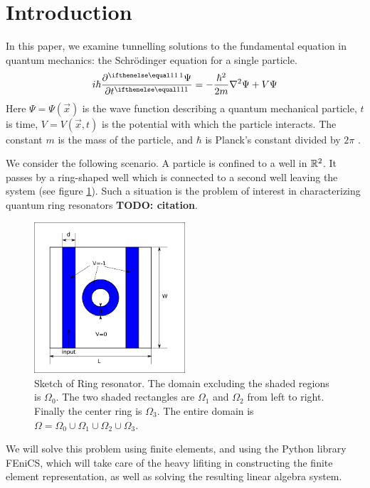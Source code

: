 \documentclass[../../main.tex]{subfiles}
\begin{document}
\section{Introduction}

In this paper, we examine tunnelling solutions to the 
fundamental equation in quantum mechanics: the Schr\"odinger equation
for a single particle.
\begin{equation}
		\label{eq:schrodinger}
		i \hbar \pder{\Psi}{t} = -\frac{\hbar^2}{2m} \nabla^2 \Psi + 
		V \Psi
\end{equation}
Here $\Psi = \Psi(\vec x)$ is the wave function describing a 
quantum mechanical particle, $t$ is time, 
$V = V(\vec x, t)$ is the potential with which the particle 
interacts.  The constant $m$ is the mass of the particle,
and $\hbar$ is Planck's constant divided by $2\pi$ 
\cite{griffiths-quantum}.  

We consider the following scenario. 
A particle is confined to a well in $\mathbb{R}^2$.  
It passes by a ring-shaped well which is connected to a 
second well leaving the system
(see figure \ref{fig:system-sketch}).
Such a situation is the problem of interest in characterizing
quantum ring resonators \textbf{TODO: citation}.

\begin{figure}[h]
		\centering
		\includegraphics[width=0.5\textwidth]{system-sketch.png}
		\caption{Sketch of Ring resonator. 
		The domain excluding the shaded regions is $\Omega_0$. 
		The two shaded rectangles are $\Omega_1$ and $\Omega_2$ from
		left to right.  Finally the center ring is 
		$\Omega_3$.  
		The entire domain is $\Omega = \Omega_0 \cup \Omega_1 \cup 
		\Omega_2 \cup \Omega_3.$}
		\label{fig:system-sketch}
\end{figure}

We will solve this problem using finite elements, and using 
the Python library FEniCS, which will take care of the heavy lifiting
in constructing the finite element representation, as well as solving
the resulting linear algebra system.
\end{document}

